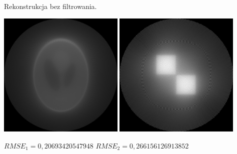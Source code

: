 \documentclass[a4paper, 11pt]{article}
\begin{document}
\newpage
\begin{center}
	Rekonstrukcja bez filtrowania.


	\includegraphics[width=0.45\textwidth]{reconstructed1.png}
	\includegraphics[width=0.45\textwidth]{reconstructed2.png}

	$RMSE_1=0,20693420547948$ \hspace{1.5cm} $RMSE_2=0,266156126913852$

\end{center}
\end{document}
